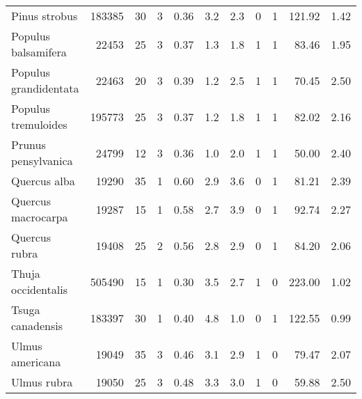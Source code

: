 \begin{landscape}
\begin{longtable}[]{@{}lrrrrrrrrrr@{}}
Pinus strobus & 183385 & 30 & 3 & 0.36 & 3.2 & 2.3 & 0 & 1 & 121.92 &
1.42\tabularnewline
Populus balsamifera & 22453 & 25 & 3 & 0.37 & 1.3 & 1.8 & 1 & 1 & 83.46
& 1.95\tabularnewline
Populus grandidentata & 22463 & 20 & 3 & 0.39 & 1.2 & 2.5 & 1 & 1 &
70.45 & 2.50\tabularnewline
Populus tremuloides & 195773 & 25 & 3 & 0.37 & 1.2 & 1.8 & 1 & 1 & 82.02
& 2.16\tabularnewline
Prunus pensylvanica & 24799 & 12 & 3 & 0.36 & 1.0 & 2.0 & 1 & 1 & 50.00
& 2.40\tabularnewline
Quercus alba & 19290 & 35 & 1 & 0.60 & 2.9 & 3.6 & 0 & 1 & 81.21 &
2.39\tabularnewline
Quercus macrocarpa & 19287 & 15 & 1 & 0.58 & 2.7 & 3.9 & 0 & 1 & 92.74 &
2.27\tabularnewline
Quercus rubra & 19408 & 25 & 2 & 0.56 & 2.8 & 2.9 & 0 & 1 & 84.20 &
2.06\tabularnewline
Thuja occidentalis & 505490 & 15 & 1 & 0.30 & 3.5 & 2.7 & 1 & 0 & 223.00
& 1.02\tabularnewline
Tsuga canadensis & 183397 & 30 & 1 & 0.40 & 4.8 & 1.0 & 0 & 1 & 122.55 &
0.99\tabularnewline
Ulmus americana & 19049 & 35 & 3 & 0.46 & 3.1 & 2.9 & 1 & 0 & 79.47 &
2.07\tabularnewline
Ulmus rubra & 19050 & 25 & 3 & 0.48 & 3.3 & 3.0 & 1 & 0 & 59.88 &
2.50\tabularnewline
\bottomrule
\end{longtable}
\end{landscape}

